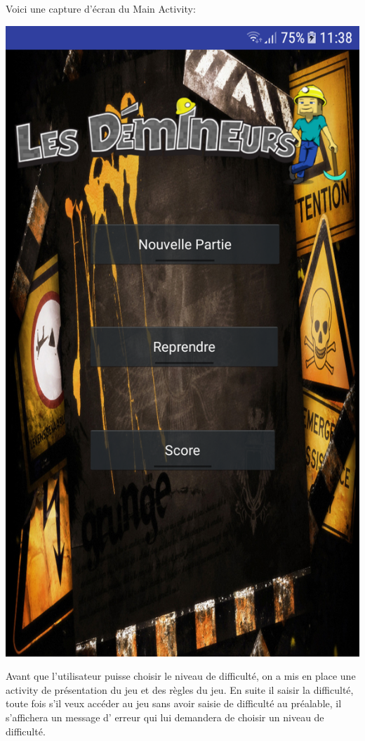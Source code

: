 \documentclass{article}
\begin{document}
Voici une capture d'écran du Main Activity:
\begin{center}
  \includegraphics[scale=0.12]{Main.png}
\end{center}

Avant que l'utilisateur puisse choisir le niveau de difficulté, on a mis en place une activity 
de présentation du jeu et des règles du jeu. En suite il saisir la difficulté, toute fois s'il veux
accéder au jeu sans  avoir saisie de difficulté au préalable, il s'affichera un message d' erreur 
qui lui demandera de choisir un niveau de difficulté. \\
 
\end{document}
